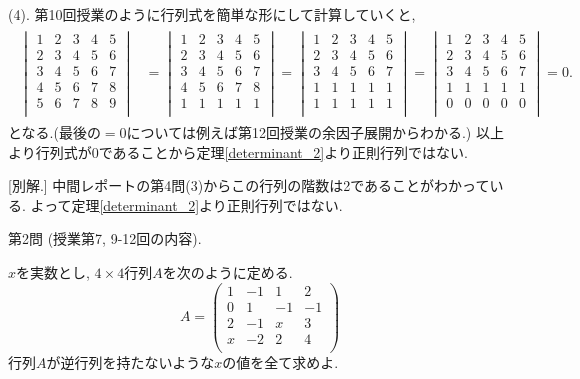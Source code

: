 \documentclass[dvipdfmx,a4paper,11pt]{article}
\theoremstyle{definition}
\begin{document}
 (4). 第10回授業のように行列式を簡単な形にして計算していくと, 
\begin{align*}
\begin{split}
 \begin{vmatrix}
 1& 2& 3  & 4&5\\
 2& 3& 4  & 5&6\\
 3& 4& 5 & 6&7\\
 4& 5& 6 & 7&8\\
 5& 6& 7 & 8&9\\
 \end{vmatrix}
&
=
 \begin{vmatrix}
 1& 2& 3  & 4&5\\
 2& 3& 4  & 5&6\\
 3& 4& 5 & 6&7\\
 4& 5& 6 & 7&8\\
 1& 1& 1 & 1&1\\
 \end{vmatrix}
  =
 \begin{vmatrix}
 1& 2& 3  & 4&5\\
 2& 3& 4  & 5&6\\
 3& 4& 5 & 6&7\\
 1& 1& 1& 1&1\\
 1& 1& 1 & 1&1\\
 \end{vmatrix}
 =
 \begin{vmatrix}
 1& 2& 3  & 4&5\\
 2& 3& 4  & 5&6\\
 3& 4& 5 & 6&7\\
 1& 1& 1& 1&1\\
 0& 0& 0 & 0&0\\
 \end{vmatrix}
=0.
\end{split}
\end{align*}
となる.(最後の$=0$については例えば第12回授業の余因子展開からわかる.)
以上より行列式が0であることから定理\ref{determinant_2}より正則行列ではない.

[別解.] 中間レポートの第4問(3)からこの行列の階数は2であることがわかっている.
 よって定理\ref{determinant_2}より正則行列ではない.

 \vspace{22pt}
   
{\Large 第2問} (授業第7, 9-12回の内容).
    \vspace{11pt}

$x$を実数とし, $4 \times 4$行列$A$を次のように定める.
 $$A=
  \begin{pmatrix}
1 &-1&1 &2\\
0 & 1&-1 &-1\\
2 &-1&x &3\\
x &-2&2&4\\
 \end{pmatrix}
 $$
行列$A$が逆行列を持たないような$x$の値を全て求めよ.
\end{document}
